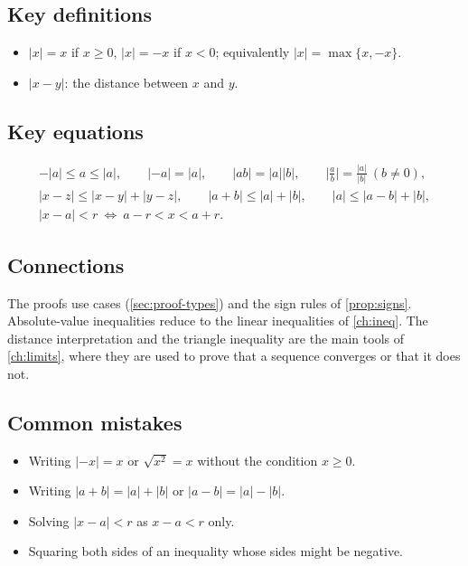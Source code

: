 \subsection*{Key definitions}
\begin{itemize}
  \item $|x|=x$ if $x\ge0$, $|x|=-x$ if $x<0$; equivalently $|x|=\max\{x,-x\}$.
  \item $|x-y|$: the distance between $x$ and $y$.
\end{itemize}

\subsection*{Key equations}
\begin{gather*}
-|a|\le a\le|a|,\qquad |{-a}|=|a|,\qquad |ab|=|a||b|,\qquad \Big|\frac ab\Big|=\frac{|a|}{|b|}\ (b\ne0),\\
|x-z|\le|x-y|+|y-z|,\qquad |a+b|\le|a|+|b|,\qquad |a|\le|a-b|+|b|,\\
|x-a|<r\ \Leftrightarrow\ a-r<x<a+r.
\end{gather*}

\subsection*{Connections}
The proofs use cases (\cref{sec:proof-types}) and the sign rules of \cref{prop:signs}. Absolute-value inequalities
reduce to the linear inequalities of \cref{ch:ineq}. The distance interpretation and the triangle inequality are
the main tools of \cref{ch:limits}, where they are used to prove that a sequence converges or that it does not.

\subsection*{Common mistakes}
\begin{itemize}
  \item Writing $|{-x}|=x$ or $\sqrt{x^2}=x$ without the condition $x\ge0$.
  \item Writing $|a+b|=|a|+|b|$ or $|a-b|=|a|-|b|$.
  \item Solving $|x-a|<r$ as $x-a<r$ only.
  \item Squaring both sides of an inequality whose sides might be negative.
\end{itemize}

